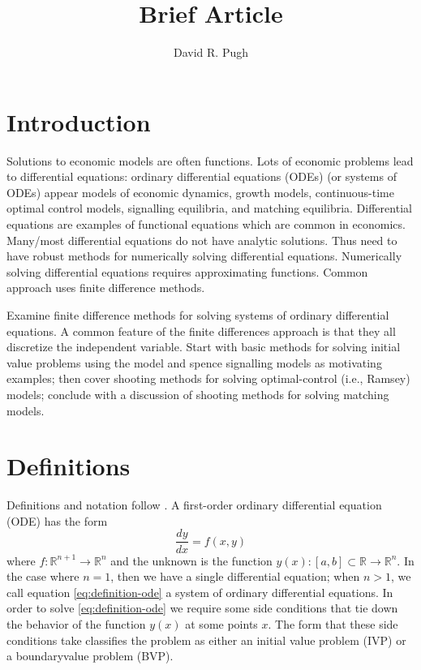 \documentclass[11pt]{article}
\title{Brief Article}
\author{David R. Pugh}
\begin{document}
\maketitle

\section{Introduction}
Solutions to economic models are often functions.  Lots of economic problems lead to differential equations: ordinary differential equations (ODEs) (or systems of ODEs) appear models of economic dynamics, growth models, continuous-time optimal control models, signalling equilibria, and matching equilibria. Differential equations are examples of functional equations which are common in economics. Many/most differential equations do not have analytic solutions.  Thus need to have robust methods for numerically solving differential equations.  Numerically solving differential equations requires approximating functions.  Common approach uses finite difference methods. 

Examine finite difference methods for solving systems of ordinary differential equations. A common feature of the finite differences approach is that they all discretize the independent variable. Start with basic methods for solving initial value problems using the \cite{solow1956contribution} model and spence signalling models as motivating examples; then cover shooting methods for solving optimal-control (i.e., Ramsey) models; conclude with a discussion of shooting methods for solving matching models.

\section{Definitions}
Definitions and notation follow \cite{judd1998numerical}. A first-order ordinary differential equation (ODE) has the form
\begin{equation}\label{eq:definition-ode}
	\frac{dy}{dx} = f(x ,y)
\end{equation}
where $f:\mathbb{R}^{n+1}\rightarrow\mathbb{R}^n$ and the unknown is the function $y(x): [a,b] \subset \mathbb{R}\rightarrow\mathbb{R}^n$.  In the case where $n=1$, then we have a single differential equation; when $n>1$, we call equation \ref{eq:definition-ode} a system of ordinary differential equations.  In order to solve \ref{eq:definition-ode} we require some side conditions that tie down the behavior of the function $y(x)$ at some points $x$.  The form that these side conditions take classifies the problem as either an initial value problem (IVP) or a boundaryvalue problem (BVP).
\end{document}
